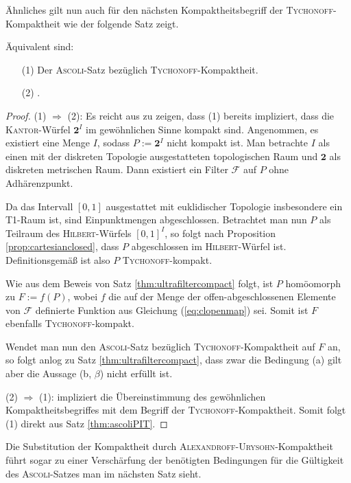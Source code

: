 Ähnliches gilt nun auch für den nächsten Kompaktheitsbegriff der \textsc{Tychonoff}\hyp{}Kompaktheit wie der folgende Satz zeigt.

\begin{thm}
  Äquivalent sind:
  \begin{enumerate}
    \item[(1)] Der \textsc{Ascoli}-Satz bezüglich \textsc{\textsc{Tychonoff}}\hyp{}Kompaktheit.
    \item[(2)] \PIT.
  \end{enumerate}
\end{thm}

\begin{proof}
  (1) $\Rightarrow$ (2): Es reicht aus zu zeigen, dass (1) bereits impliziert, dass die \textsc{Kantor}\hyp{}Würfel $\mathbf{2}^I$ im gewöhnlichen Sinne kompakt sind.
  Angenommen, es existiert eine Menge $I$, sodass $P:= \mathbf{2}^I$ nicht kompakt ist.
  Man betrachte $I$ als einen mit der diskreten Topologie ausgestatteten topologischen Raum und $\mathbf{2}$ als diskreten metrischen Raum.
  Dann existiert ein Filter $\mathcal{F}$ auf $P$ ohne Adhärenzpunkt.

  Da das Intervall $[0,1]$ ausgestattet mit euklidischer Topologie insbesondere ein T1\hyp{}Raum ist, sind Einpunktmengen abgeschlossen.
  Betrachtet man nun $P$ als Teilraum des \textsc{Hilbert}\hyp{}Würfels $[0,1]^I$, so folgt nach Proposition \ref{prop:cartesianclosed}, dass $P$ abgeschlossen im \textsc{Hilbert}\hyp{}Würfel ist.
  Definitionsgemäß ist also $P$ \textsc{Tychonoff}\hyp{}kompakt.

  Wie aus dem Beweis von Satz \ref{thm:ultrafiltercompact} folgt, ist $P$ homöomorph zu $F:= f(P)$, wobei $f$ die auf der Menge der offen\hyp{}abgeschlossenen Elemente von $\mathcal{F}$ definierte Funktion aus Gleichung (\ref{eq:clopenmap}) sei.
  Somit ist $F$ ebenfalls \textsc{Tychonoff}\hyp{}kompakt.

  Wendet man nun den \textsc{Ascoli}\hyp{}Satz bezüglich \textsc{Tychonoff}\hyp{}Kompaktheit auf $F$ an, so folgt anlog zu Satz \ref{thm:ultrafiltercompact}, dass zwar die Bedingung (a) gilt aber die Aussage (b, $\beta$) nicht erfüllt ist.

  (2) $\Rightarrow$ (1): \PIT impliziert die Übereinstimmung des gewöhnlichen Kompaktheitsbegriffes mit dem Begriff der \textsc{Tychonoff}\hyp{}Kompaktheit. Somit folgt (1) direkt aus Satz \ref{thm:ascoliPIT}.
\end{proof}

Die Substitution der Kompaktheit durch \textsc{Alexandroff}\hyp{}\textsc{Urysohn}\hyp{}Kompaktheit führt sogar zu einer Verschärfung der benötigten Bedingungen für die Gültigkeit des \textsc{Ascoli}\hyp{}Satzes man im nächsten Satz sieht.

